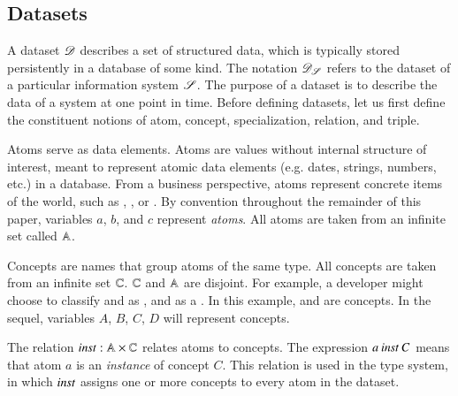 \documentclass{elsarticle}
\begin{document}
\subsection{Datasets}
\label{sct:Datasets}
   A dataset $\mathscr{D}$ describes a set of structured data, which is typically stored persistently in a database of some kind.
   The notation $\mathscr{D}_{\mathscr{S}}$ refers to the dataset of a particular information system $\mathscr{S}$.
   The purpose of a dataset is to describe the data of a system at one point in time. 
   Before defining datasets, let us first define the constituent notions of atom, concept, specialization, relation, and triple.
   
   Atoms serve as data elements.
   Atoms are values without internal structure of interest, meant to represent atomic data elements (e.g. dates, strings, numbers, etc.) in a database.
   From a business perspective, atoms represent concrete items of the world,
   such as , , or .
   By convention throughout the remainder of this paper, variables $a$, $b$, and $c$ represent \emph{atoms}.
   All atoms are taken from an infinite set called $\mathbb{A}$.
   
   Concepts are names that group atoms of the same type.
   All concepts are taken from an infinite set $\mathbb{C}$.
   $\mathbb{C}$ and $\mathbb{A}$ are disjoint.
   For example, a developer might choose to classify  and  as ,
   and  as a .
   In this example,  and  are concepts.
   In the sequel, variables $A$, $B$, $C$, $D$ will represent concepts.

   The relation $\mathbin{\text{\it inst\/}}:\mathbb{A}\times\mathbb{C}$ relates atoms to concepts.
   The expression $a\mathbin{\text{\it inst\/}} C$ means that atom $a$ is an \emph{instance} of concept $C$.
   This relation is used in the type system, in which $\mathbin{\text{\it inst\/}}$ assigns one or more concepts to every atom in the dataset.

\end{document}
